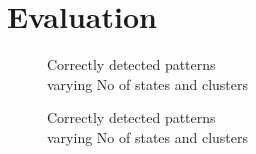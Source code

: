 \documentclass{article}
\begin{document}
\section{Evaluation}
\label{experimental}
\begin{figure}[h]
\centering
\begin{minipage}{.48\textwidth}
  \centering
  \caption{Correctly detected patterns\\varying No of states and clusters}
  \label{fig:test1}
\end{minipage}%
\begin{minipage}{.48\textwidth}
  \centering
  \caption{Correctly detected patterns \\ varying No of states and clusters}
  \label{fig:test2}
\end{minipage}
\end{figure}
\end{document}
